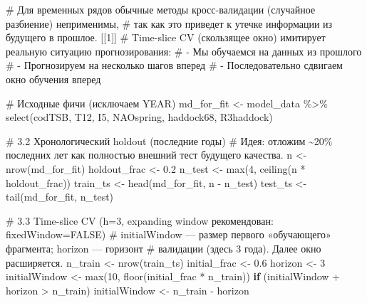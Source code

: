 \documentclass[
  letterpaper,
  DIV=11,
  numbers=noendperiod]{scrreprt}
\newenvironment{Shaded}{\begin{snugshade}}{\end{snugshade}}
\newcommand{\CommentTok}[1]{\textcolor[rgb]{0.37,0.37,0.37}{#1}}
\newcommand{\ControlFlowTok}[1]{\textcolor[rgb]{0.00,0.23,0.31}{\textbf{#1}}}
\newcommand{\DecValTok}[1]{\textcolor[rgb]{0.68,0.00,0.00}{#1}}
\newcommand{\FloatTok}[1]{\textcolor[rgb]{0.68,0.00,0.00}{#1}}
\newcommand{\FunctionTok}[1]{\textcolor[rgb]{0.28,0.35,0.67}{#1}}
\newcommand{\NormalTok}[1]{\textcolor[rgb]{0.00,0.23,0.31}{#1}}
\newcommand{\OtherTok}[1]{\textcolor[rgb]{0.00,0.23,0.31}{#1}}
\newcommand{\SpecialCharTok}[1]{\textcolor[rgb]{0.37,0.37,0.37}{#1}}
\begin{document}
\begin{Shaded}
\begin{Highlighting}[]
\CommentTok{\# Для временных рядов обычные методы кросс{-}валидации (случайное разбиение) неприменимы,}
\CommentTok{\# так как это приведет к утечке информации из будущего в прошлое. [[1]]}
\CommentTok{\# Time{-}slice CV (скользящее окно) имитирует реальную ситуацию прогнозирования:}
\CommentTok{\#   {-} Мы обучаемся на данных из прошлого}
\CommentTok{\#   {-} Прогнозируем на несколько шагов вперед}
\CommentTok{\#   {-} Последовательно сдвигаем окно обучения вперед}

\CommentTok{\# Исходные фичи (исключаем YEAR)}
\NormalTok{md\_for\_fit }\OtherTok{\textless{}{-}}\NormalTok{ model\_data }\SpecialCharTok{\%\textgreater{}\%} \FunctionTok{select}\NormalTok{(codTSB, T12, I5, NAOspring, haddock68, R3haddock)}

\CommentTok{\# 3.2 Хронологический holdout (последние годы)}
\CommentTok{\# Идея: отложим \textasciitilde{}20\% последних лет как полностью внешний тест будущего качества.}
\NormalTok{n }\OtherTok{\textless{}{-}} \FunctionTok{nrow}\NormalTok{(md\_for\_fit)}
\NormalTok{holdout\_frac }\OtherTok{\textless{}{-}} \FloatTok{0.2}
\NormalTok{n\_test }\OtherTok{\textless{}{-}} \FunctionTok{max}\NormalTok{(}\DecValTok{4}\NormalTok{, }\FunctionTok{ceiling}\NormalTok{(n }\SpecialCharTok{*}\NormalTok{ holdout\_frac))}
\NormalTok{train\_ts }\OtherTok{\textless{}{-}} \FunctionTok{head}\NormalTok{(md\_for\_fit, n }\SpecialCharTok{{-}}\NormalTok{ n\_test)}
\NormalTok{test\_ts  }\OtherTok{\textless{}{-}} \FunctionTok{tail}\NormalTok{(md\_for\_fit, n\_test)}

\CommentTok{\# 3.3 Time{-}slice CV (h=3, expanding window рекомендован: fixedWindow=FALSE)}
\CommentTok{\# initialWindow — размер первого «обучающего» фрагмента; horizon — горизонт}
\CommentTok{\# валидации (здесь 3 года). Далее окно расширяется.}
\NormalTok{n\_train }\OtherTok{\textless{}{-}} \FunctionTok{nrow}\NormalTok{(train\_ts)}
\NormalTok{initial\_frac }\OtherTok{\textless{}{-}} \FloatTok{0.6}
\NormalTok{horizon      }\OtherTok{\textless{}{-}} \DecValTok{3}
\NormalTok{initialWindow }\OtherTok{\textless{}{-}} \FunctionTok{max}\NormalTok{(}\DecValTok{10}\NormalTok{, }\FunctionTok{floor}\NormalTok{(initial\_frac }\SpecialCharTok{*}\NormalTok{ n\_train))}
\ControlFlowTok{if}\NormalTok{ (initialWindow }\SpecialCharTok{+}\NormalTok{ horizon }\SpecialCharTok{\textgreater{}}\NormalTok{ n\_train) initialWindow }\OtherTok{\textless{}{-}}\NormalTok{ n\_train }\SpecialCharTok{{-}}\NormalTok{ horizon}


\end{Highlighting}
\end{Shaded}
\end{document}

